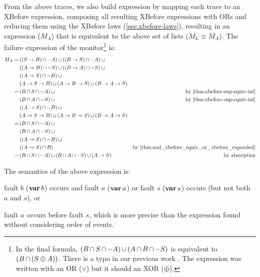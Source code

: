 \documentclass[12pt,openright,twoside,a4paper,oldfontcommands,english,brazil,final]{abntex2}
\theoremstyle{theo}
\def\varop{\ensuremath\operatorname{\mathbf{var}}}
\newcommand{\var}[1]{\ensuremath\varop #1}
\def\xbeforeop{\ensuremath\rightarrow}
\newcommand{\xbefore}[2]{\ensuremath #1 \xbeforeop #2 }
\newcommand{\parsin}[1]{\ensuremath\left( #1 \right)}
\def\union{\ensuremath\operatorname{\cup}}
\def\inter{\ensuremath\operatorname{\cap}}
\begin{document}
From the above traces, we also build  expression by mapping each trace to an \ac{XBefore} expression, composing all resulting \ac{XBefore} expressions with ORs and reducing them using the \ac{XBefore} laws (\cref{sec:xbefore-laws}), resulting in an expression ($M_A$) that is equivalent to the above set of lists ($M_L \equiv M_A$).
The failure expression of the monitor\footnote{In the final formula, $\parsin{B \inter S \inter -A} \union \parsin{A \inter B \inter -S}$ is equivalent to $\parsin{B \inter \parsin{S \oplus A}}$. There is a typo in our previous work \cite{DM2015}. The expression was written with an OR ($\lor$) but it should an XOR ($\oplus$).} is:
%
\begin{align*}
M_A = & \parsin{\parsin{\xbefore{S}{B}} \inter -A} \union \parsin{\parsin{\xbefore{B}{S}} \inter -A} \union\\
  &\parsin{\parsin{\xbefore{A}{B}} \inter -S} \union \parsin{\parsin{\xbefore{B}{A}} \inter -S} \union\\
  & \parsin{\parsin{\xbefore{A}{S}} \inter -B} \union \\
  & \parsin{\xbefore{\xbefore{A}{S}}{B}} \union \parsin{\xbefore{\xbefore{A}{B}}{S}} \union \parsin{\xbefore{\xbefore{B}{A}}{S}} \\
= &\parsin{B \inter S \inter -A} \union & \text{by \eqref{thm:xbefore-sup-equiv-inf}}\\
  & \parsin{B \inter A \inter -S} \union & \text{by \eqref{thm:xbefore-sup-equiv-inf}}\\
  & \parsin{\parsin{\xbefore{A}{S}} \inter -B} \union\\
  & \parsin{\xbefore{\xbefore{A}{S}}{B}} \union \parsin{\xbefore{\xbefore{A}{B}}{S}} \union \parsin{\xbefore{\xbefore{B}{A}}{S}}\\
%
= &\parsin{B \inter S \inter -A} \union \\
  & \parsin{B \inter A \inter -S} \union \\
  & \parsin{\parsin{\xbefore{A}{S}} \inter -B} \union \\
  & \parsin{\parsin{\xbefore{A}{S}} \inter B} & \text{by \eqref{thm:and_xbefore_equiv_or_xbefore_expanded}}\\
%
= &\parsin{B \inter S \inter -A} \union \parsin{B \inter A \inter -S} \union \parsin{\xbefore{A}{S}} & \text{by absorption}
\end{align*}

The semantics of the above expression is:
\begin{alineasinline}
  \item fault $b$ ($\var{b}$) occurs and fault $a$ ($\var{a}$) or fault $s$ ($\var{s}$) occurs (but not both $a$ and $s$), or
  \item fault $a$ occurs before fault $s$, which is more precise than the expression found without considering order of events.
\end{alineasinline}
\end{document}
